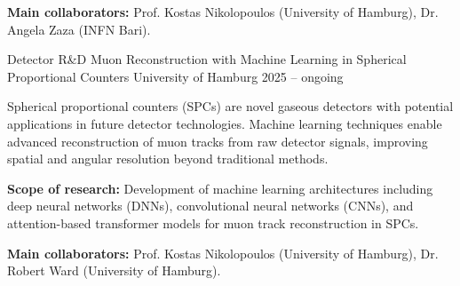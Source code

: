 \begin{cventries}
{\begin{cvitems}
    \item \textbf{Main collaborators:} Prof. Kostas Nikolopoulos (University of Hamburg), Dr. Angela Zaza (INFN Bari).
  \end{cvitems}
}
\cventry
  {Detector R\&D} %
  {Muon Reconstruction with Machine Learning in Spherical Proportional Counters} %
  {University of Hamburg} %
  {2025 -- ongoing} %
{
  \begin{cvitems} %
    \item {Spherical proportional counters (SPCs) are novel gaseous detectors with potential applications in future detector technologies. Machine learning techniques enable advanced reconstruction of muon tracks from raw detector signals, improving spatial and angular resolution beyond traditional methods.}
    \item \textbf{Scope of research:} Development of machine learning architectures including deep neural networks (DNNs), convolutional neural networks (CNNs), and attention-based transformer models for muon track reconstruction in SPCs.
    \item \textbf{Main collaborators:} Prof. Kostas Nikolopoulos (University of Hamburg), Dr. Robert Ward (University of Hamburg).
  \end{cvitems}
}

\end{cventries}

